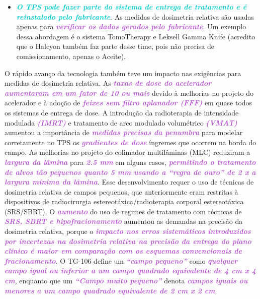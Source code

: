 \documentclass[11pt,a4paper]{article}
\newcounter{exemplo}
\begin{document}
\begin{itemize}[label=\textcolor{CarnationPink}{$\blacktriangleright$}]
		\item \textcolor{DarkTurquoise}{\textbf{\textit{O TPS pode fazer parte do sistema de entrega de tratamento e é reinstalado pelo fabricante}}}. As medidas de dosimetria relativa são usadas apenas para \textcolor{MediumOrchid}{\textbf{\textit{verificar os dados gerados pelo fabricante}}}. Um exemplo dessa abordagem é o sistema TomoTherapy e Leksell Gamma Knife (acredito que o Halcyon também faz parte desse time, pois não precisa de comissionamento, apenas o Aceite).
	\end{itemize}

	O rápido avanço da tecnologia também teve um impacto nas exigências para medidas de dosimetria relativa. As \textcolor{MediumOrchid}{\textbf{\textit{taxas de dose do acelerador aumentaram em um fator de 10 ou mais}}} devido à melhorias no projeto do acelerador e à adoção de \textcolor{MediumOrchid}{\textbf{\textit{feixes sem filtro aplanador (FFF)}}} em quase todos os sistemas de entrega de dose. A introdução da radioterapia de intensidade modulada \textcolor{MediumOrchid}{\textbf{\textit{(IMRT)}}} e tratamento de arco modulado volumétrico \textcolor{MediumOrchid}{\textbf{\textit{(VMAT)}}} aumentou a importância de \textcolor{MediumOrchid}{\textbf{\textit{medidas precisas da penumbra}}} para modelar corretamente no TPS os \textcolor{MediumOrchid}{\textbf{\textit{gradientes de dose}}} íngremes que ocorrem na borda do campo. As melhorias no projeto do colimador multilâminas (MLC) reduziram a \textcolor{MediumOrchid}{\textbf{\textit{largura da lâmina}}} para \textcolor{MediumOrchid}{\textbf{\textit{2.5 mm}}} em alguns casos, \textcolor{MediumOrchid}{\textbf{\textit{permitindo o tratamento de alvos tão pequenos quanto 5 mm usando a ``regra de ouro'' de 2 x a largura mínima da lâmina}}}. Esse desenvolvimento requer o uso de técnicas de dosimetria relativa de campos pequenos, que anteriormente eram restritas à dispositivos de radiocirurgia estereotáxica/radioterapia corporal estereotáxica (SRS/SBRT). O \textcolor{MediumOrchid}{\textbf{\textit{aumento}}} do uso de regimes de tratamento com técnicas de \textcolor{MediumOrchid}{\textbf{\textit{SRS, SBRT e hipofracionamento}}} aumentou as demandas na precisão da dosimetria relativa, porque o \textcolor{MediumOrchid}{\textbf{\textit{impacto nos erros sistemáticos introduzidos por incertezas na dosimetria relativa na precisão da entrega do plano clínico é maior em comparação com os esquemas convencionais de fracionamento}}}. O TG-106 define um \textcolor{MediumOrchid}{\textbf{\textit{“campo pequeno”}}} como \textcolor{MediumOrchid}{\textbf{\textit{qualquer campo igual ou inferior a um campo quadrado equivalente de 4 cm x 4 cm}}}, enquanto que um \textcolor{MediumOrchid}{\textbf{\textit{“Campo muito pequeno”}}} denota \textcolor{MediumOrchid}{\textbf{\textit{campos iguais ou menores a um campo quadrado equivalente de 2 cm x 2 cm}}}.
\end{document}
